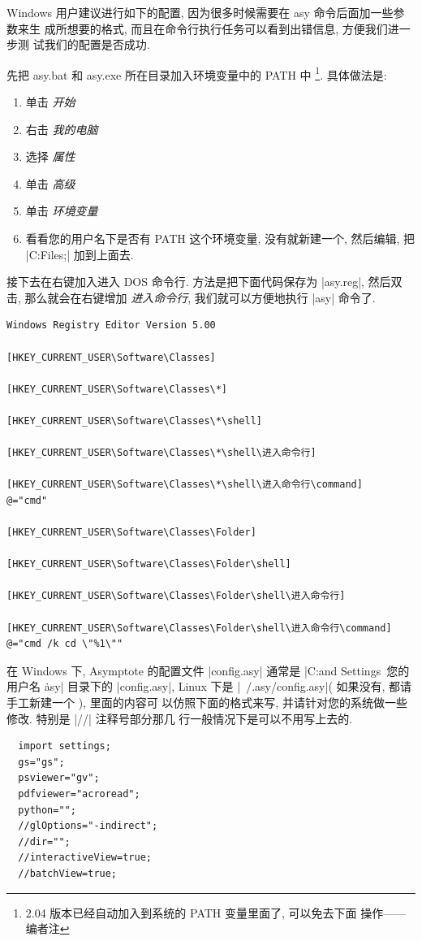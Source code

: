 \documentclass[nofonts,CJKnormalspaces]{ctexbook}[2009/05/20]
\newcommand\transnote[1]{\footnote{#1——编者注}}
\begin{document}
Windows 用户建议进行如下的配置, 因为很多时候需要在 asy 命令后面加一些参数来生
成所想要的格式, 而且在命令行执行任务可以看到出错信息, 方便我们进一步测
试我们的配置是否成功.

先把 asy.bat 和 asy.exe 所在目录加入环境变量中的 PATH 中
\transnote{2.04 版本已经自动加入到系统的 PATH 变量里面了, 可以免去下面
  操作}. 具体做法是:
\begin{enumerate}
\item  单击 \emph{开始}
\item 右击 \emph{我的电脑}
\item 选择 \emph{属性}
\item 单击 \emph{高级}
\item 单击 \emph{环境变量}
\item 看看您的用户名下是否有 PATH 这个环境变量, 没有就新建一个, 然后编辑, 把
  |C:\Program Files\Asymptote;| 加到上面去.
\end{enumerate}

接下去在右键加入进入 DOS 命令行.
\label{Windows:DOS}
方法是把下面代码保存为 |asy.reg|, 然后双击, 那么就会在右键增加
\emph{进入命令行}, 我们就可以方便地执行 |asy| 命令了.
\begin{verbatim}
Windows Registry Editor Version 5.00

[HKEY_CURRENT_USER\Software\Classes]

[HKEY_CURRENT_USER\Software\Classes\*]

[HKEY_CURRENT_USER\Software\Classes\*\shell]

[HKEY_CURRENT_USER\Software\Classes\*\shell\进入命令行]

[HKEY_CURRENT_USER\Software\Classes\*\shell\进入命令行\command]
@="cmd"

[HKEY_CURRENT_USER\Software\Classes\Folder]

[HKEY_CURRENT_USER\Software\Classes\Folder\shell]

[HKEY_CURRENT_USER\Software\Classes\Folder\shell\进入命令行]

[HKEY_CURRENT_USER\Software\Classes\Folder\shell\进入命令行\command]
@="cmd /k cd \"%1\""
\end{verbatim}

在 Windows 下, Asymptote 的配置文件 |config.asy| 通常是
|C:\Documents and Settings\ 您的用户名 \.asy| 目录下的 |config.asy|,
Linux 下是 |~/.asy/config.asy|( 如果没有, 都请手工新建一个 ), 里面的内容可
以仿照下面的格式来写, 并请针对您的系统做一些修改. 特别是 |//| 注释号部分那几
行一般情况下是可以不用写上去的.
\begin{lstlisting}
  import settings;
  gs="gs";
  psviewer="gv";
  pdfviewer="acroread";
  python="";
  //glOptions="-indirect";
  //dir="";
  //interactiveView=true;
  //batchView=true;
\end{lstlisting}
\end{document}
